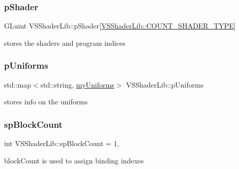 \subsubsection{\texorpdfstring{p\+Shader}{pShader}}
{\footnotesize\ttfamily G\+Luint V\+S\+Shader\+Lib\+::p\+Shader\mbox{[}\hyperlink{class_v_s_shader_lib_ae8a4410569faa6d4df9760e998a9706aa112e7924ef9a87ad0d894fe216f84e39}{V\+S\+Shader\+Lib\+::\+C\+O\+U\+N\+T\+\_\+\+S\+H\+A\+D\+E\+R\+\_\+\+T\+Y\+PE}\mbox{]}\hspace{0.3cm}{\ttfamily [protected]}}



stores the shaders and program indices 

\mbox{\label{class_v_s_shader_lib_a24c8f833871e02d217b04bc7305917ea}} 
\subsubsection{\texorpdfstring{p\+Uniforms}{pUniforms}}
{\footnotesize\ttfamily std\+::map$<$std\+::string, \hyperlink{class_v_s_shader_lib_a3302b287e0686235d57404bd4587c1e6}{my\+Uniforms}$>$ V\+S\+Shader\+Lib\+::p\+Uniforms\hspace{0.3cm}{\ttfamily [protected]}}



stores info on the uniforms 

\mbox{\label{class_v_s_shader_lib_a1b796c1a75d72e11024f7a4060f4053d}} 
\subsubsection{\texorpdfstring{sp\+Block\+Count}{spBlockCount}}
{\footnotesize\ttfamily int V\+S\+Shader\+Lib\+::sp\+Block\+Count = 1\hspace{0.3cm}{\ttfamily [static]}, {\ttfamily [protected]}}



block\+Count is used to assign binding indexes 

\mbox{\label{class_v_s_shader_lib_a9d8ab63d3b8e5471c9e6d7ffe08b9921}} 
